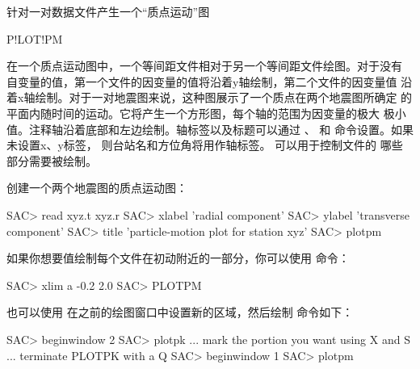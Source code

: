 \label{cmd:plotpm}

针对一对数据文件产生一个``质点运动''图

\begin{SACSTX}
P!LOT!PM
\end{SACSTX}

在一个质点运动图中，一个等间距文件相对于另一个等间距文件绘图。对于没有
自变量的值，第一个文件的因变量的值将沿着y轴绘制，第二个文件的因变量值
沿着x轴绘制。对于一对地震图来说，这种图展示了一个质点在两个地震图所确定
的平面内随时间的运动。它将产生一个方形图，每个轴的范围为因变量的极大
极小值。注释轴沿着底部和左边绘制。轴标签以及标题可以通过 、
 和  命令设置。如果未设置x、y标签，
则台站名和方位角将用作轴标签。 可以用于控制文件的
哪些部分需要被绘制。

创建一个两个地震图的质点运动图：
\begin{SACCode}
SAC> read xyz.t xyz.r
SAC> xlabel 'radial component'
SAC> ylabel 'transverse component'
SAC> title 'particle-motion plot for station xyz'
SAC> plotpm
\end{SACCode}

如果你想要值绘制每个文件在初动附近的一部分，你可以使用 
命令：
\begin{SACCode}
SAC> xlim a -0.2 2.0
SAC> PLOTPM
\end{SACCode}

也可以使用  在之前的绘图窗口中设置新的区域，然后绘制
命令如下：
\begin{SACCode}
SAC> beginwindow 2
SAC> plotpk
 ... mark the portion you want using X and S
 ... terminate PLOTPK with a Q
SAC> beginwindow 1
SAC> plotpm
\end{SACCode}
